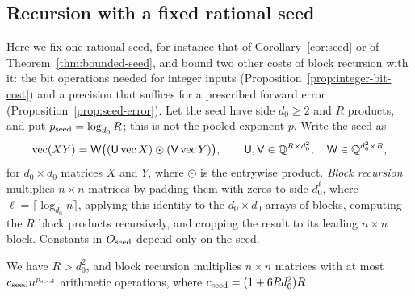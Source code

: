 \subsection{Recursion with a fixed rational seed}
\label{subsec:seed-recursion}

Here we fix one rational seed, for instance that of
Corollary~\ref{cor:seed} or of Theorem~\ref{thm:bounded-seed}, and bound
two other costs of block recursion with it: the bit operations needed
for integer inputs (Proposition~\ref{prop:integer-bit-cost}) and a
precision that suffices for a prescribed forward error
(Proposition~\ref{prop:seed-error}). Let the seed have side
\(d_0\ge2\) and \(R\) products, and put \(p_{\rm seed}=\log_{d_0}R\);
this is not the pooled exponent \(p\). Write the seed as
\[
 \operatorname{vec}(XY)
 =\mathsf W\bigl((\mathsf U\operatorname{vec}X)\odot
   (\mathsf V\operatorname{vec}Y)\bigr),
 \qquad \mathsf U,\mathsf V\in\mathbb Q^{R\times d_0^2},\quad
 \mathsf W\in\mathbb Q^{d_0^2\times R},
\]
for \(d_0\times d_0\) matrices \(X\) and \(Y\), where \(\odot\) is the
entrywise product. \emph{Block recursion} multiplies \(n\times n\)
matrices by padding them with zeros to side \(d_0^\ell\), where
\(\ell=\lceil\log_{d_0}n\rceil\), applying this identity to the
\(d_0\times d_0\) arrays of blocks, computing the \(R\) block products
recursively, and cropping the result to its leading \(n\times n\) block.
Constants in \(O_{\rm seed}\) depend only on the seed.

\begin{lemma}\label{lem:seed-recursion}
We have \(R>d_0^2\), and block recursion multiplies \(n\times n\)
matrices with at most \(c_{\rm seed}n^{p_{\rm seed}}\) arithmetic
operations, where \(c_{\rm seed}=(1+6Rd_0^2)R\).
\end{lemma}

